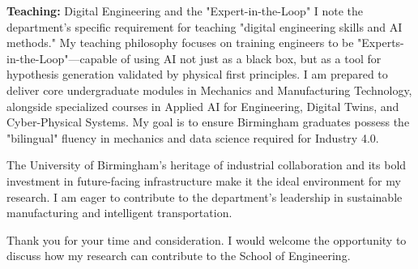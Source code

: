 \documentclass[10pt,a4paper,roman]{moderncv}
\begin{document}
\textbf{Teaching:} Digital Engineering and the "Expert-in-the-Loop" I note the department’s specific requirement for teaching "digital engineering skills and AI methods." My teaching philosophy focuses on training engineers to be "Experts-in-the-Loop"—capable of using AI not just as a black box, but as a tool for hypothesis generation validated by physical first principles. I am prepared to deliver core undergraduate modules in Mechanics and Manufacturing Technology, alongside specialized courses in Applied AI for Engineering, Digital Twins, and Cyber-Physical Systems. My goal is to ensure Birmingham graduates possess the "bilingual" fluency in mechanics and data science required for Industry 4.0.

The University of Birmingham’s heritage of industrial collaboration and its bold investment in future-facing infrastructure make it the ideal environment for my research. I am eager to contribute to the department's leadership in sustainable manufacturing and intelligent transportation.

Thank you for your time and consideration. I would welcome the opportunity to discuss how my research can contribute to the School of Engineering.

\vspace{0.5cm}

\makeletterclosing
\end{document}
